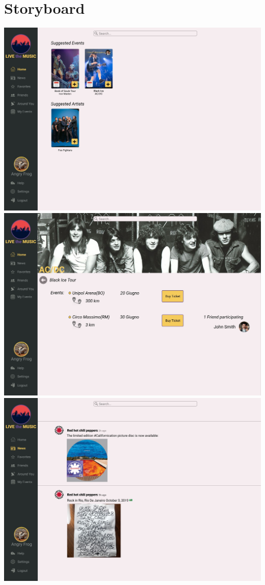 \documentclass[11pt,a4paper]{article}
\begin{document}
\section{Storyboard}
\includegraphics[scale=0.75]{Home.jpg}
\includegraphics[scale=0.75]{Concert.jpg}
\includegraphics[scale=0.75]{News.jpg}
\end{document}
